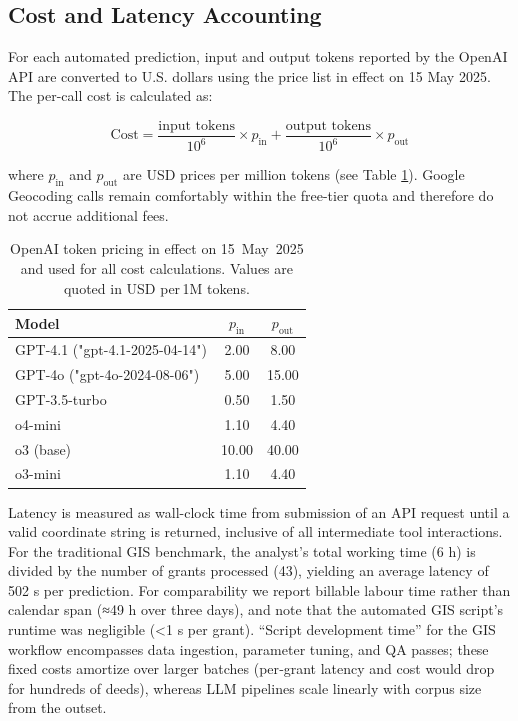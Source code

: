 \subsection{Cost and Latency
Accounting}\label{cost-and-latency-accounting}

For each automated prediction, input and output tokens reported by the
OpenAI API are converted to U.S. dollars using the price list in effect
on 15 May 2025. The per-call cost is calculated as:

\[
\text{Cost} = \frac{\text{input tokens}}{10^{6}} \times p_{\text{in}} + \frac{\text{output tokens}}{10^{6}} \times p_{\text{out}}
\]

where \(p_{\text{in}}\) and \(p_{\text{out}}\) are USD prices per
million tokens (see Table \ref{tbl:prices}). Google Geocoding calls
remain comfortably within the free-tier quota and therefore do not
accrue additional fees.

\begin{table}
\centering
\caption{OpenAI token pricing in effect on 15~May~2025 and used for all cost calculations.  Values are quoted in USD per\,1M tokens.}
\label{tbl:prices}
\begin{tabular}{lcc}
\toprule
Model & $p_{\text{in}}$ & $p_{\text{out}}$ \\
\midrule
GPT-4.1 ("gpt-4.1-2025-04-14") & 2.00 & 8.00 \\
GPT-4o ("gpt-4o-2024-08-06") & 5.00 & 15.00 \\
GPT-3.5-turbo & 0.50 & 1.50 \\
o4-mini & 1.10 & 4.40 \\
o3 (base) & 10.00 & 40.00 \\
o3-mini & 1.10 & 4.40 \\
\bottomrule
\end{tabular}
\end{table}

Latency is measured as wall-clock time from submission of an API request
until a valid coordinate string is returned, inclusive of all
intermediate tool interactions. For the traditional GIS benchmark, the
analyst's total working time (6 h) is divided by the number of grants
processed (43), yielding an average latency of 502 s per prediction. For
comparability we report billable labour time rather than calendar span
(≈49 h over three days), and note that the automated GIS script's
runtime was negligible (\textless1 s per grant). ``Script development
time'' for the GIS workflow encompasses data ingestion, parameter
tuning, and QA passes; these fixed costs amortize over larger batches
(per‑grant latency and cost would drop for hundreds of deeds), whereas
LLM pipelines scale linearly with corpus size from the outset.

